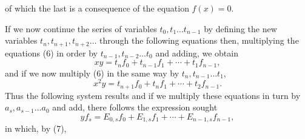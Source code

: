 of which the last is a consequence of the equation $f(x) = 0$.

If we now continue the series of variables $t_0, t_1 \ldots t_{n-1}$ by defining the new variables $t_n, t_{n+1}, t_{n+2} \ldots$ through the following equations
then, multiplying the equations (6) in order by $t_{n-1}, t_{n-2} \ldots t_0$ and adding, we obtain
\[
x y = t_n f_0 + t_{n-1} f_1 + \cdots + t_1 f_{n-1},
\]
and if we now multiply (6) in the same way by $t_n, t_{n-1} \ldots t_1$,
\[
x^2 y = t_{n+1} f_0 + t_n f_1 + \cdots + t_2 f_{n-1}.
\]
Thus the following system results
and if we multiply these equations in turn by $a_s, a_{s-1} \ldots a_0$ and add, there follows the expression sought
\[
y f_s = E_{0,s} f_0 + E_{1,s} f_1 + \cdots + E_{n-1,s} f_{n-1},
\]
in which, by (7),
